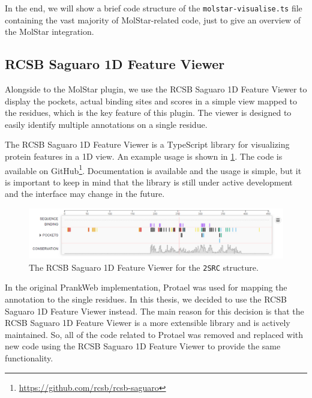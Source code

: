 In the end, we will show a brief code structure of the \texttt{molstar-visualise.ts} file containing the vast majority of MolStar-related code, just to give an overview of the MolStar integration.




\subsection{RCSB Saguaro 1D Feature Viewer}
\label{subsec:frontend-saguaro}

Alongside to the MolStar plugin, we use the RCSB Saguaro 1D Feature Viewer to display the pockets, actual binding sites and scores in a simple view mapped to the residues, which is the key feature of this plugin. The viewer is designed to easily identify multiple annotations on a single residue.

The RCSB Saguaro 1D Feature Viewer is a TypeScript library for visualizing protein features in a 1D view. An example usage is shown in \cref{fig:1d-viewer}. The code is available on GitHub\footnote{\url{https://github.com/rcsb/rcsb-saguaro}}. Documentation is available and the usage is simple, but it is important to keep in mind that the library is still under active development and the interface may change in the future.

\begin{figure}[htb]
    \centering
    \includegraphics[width=\linewidth]{img/rcsb_2src.pdf}
    \caption{The RCSB Saguaro 1D Feature Viewer for the \texttt{2SRC} structure.}
    \label{fig:1d-viewer}
\end{figure}

In the original PrankWeb implementation, Protael was used for mapping the annotation to the single residues. In this thesis, we decided to use the RCSB Saguaro 1D Feature Viewer instead. The main reason for this decision is that the RCSB Saguaro 1D Feature Viewer is a more extensible library and is actively maintained. So, all of the code related to Protael was removed and replaced with new code using the RCSB Saguaro 1D Feature Viewer to provide the same functionality.

